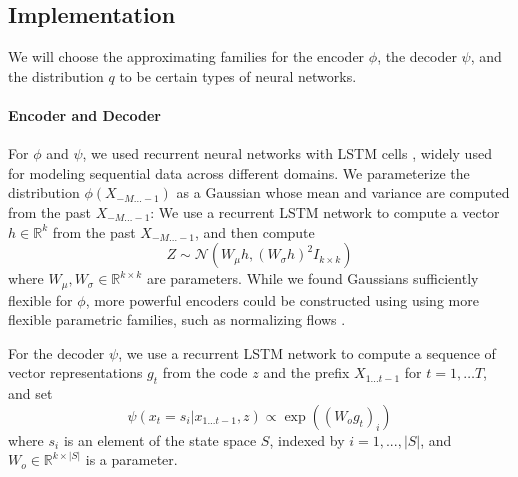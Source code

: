\documentclass[11pt,letterpaper]{article}
\begin{document}
\subsection{Implementation}
We will choose the approximating families for the encoder $\phi$, the decoder $\psi$, and the distribution $q$ to be certain types of neural networks.
\paragraph{Encoder and Decoder}
For $\phi$ and $\psi$, we used recurrent neural networks with LSTM cells \citep{hochreiter-long-1997}, widely used for modeling sequential data across different domains.
We parameterize the distribution $\phi(X_{-M\dots-1})$ as a Gaussian whose mean and variance are computed from the past $X_{-M\dots-1}$:
We use a recurrent LSTM network to compute a vector $h \in \mathbb{R}^k$ from the past $X_{-M\dots-1}$, and then compute
\begin{equation}
	Z \sim \mathcal{N}(W_\mu h, (W_\sigma h)^2 I_{k\times k})
\end{equation}
where $W_\mu, W_\sigma \in \mathbb{R}^{k\times k}$ are parameters.
While we found Gaussians sufficiently flexible for $\phi$, more powerful encoders could be constructed using using more flexible parametric families, such as normalizing flows \citep{rezende-variational-2015, kingma-improving-2016}.

For the decoder $\psi$, we use a recurrent LSTM network to compute a sequence of vector representations $g_t$ from the code $z$ and the prefix $X_{1\dots t-1}$ for $t = 1, \dots T$, and set
\begin{equation}
	\psi(x_t = s_i|x_{1...t-1}, z) \propto \exp((W_o g_t)_i)
\end{equation}
where $s_i$ is an element of the state space $S$, indexed by $i=1, ..., |S|$, and $W_o \in \mathbb{R}^{k \times |S|}$ is a parameter.




%
\end{document}
